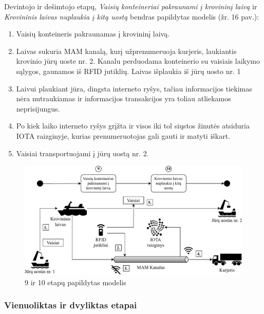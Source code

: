 Devintojo ir dešimtojo etapų, \textit{Vaisių konteineriai pakraunami į krovininį laivą} ir \textit{Krovininis laivas nuplaukia į kitą uostą} bendras papildytas modelis (žr. 16 pav.):
\begin{enumerate}
    \item Vaisių konteineris pakraunamas į krovininį laivą.
    \item Laivas sukuria MAM kanalą, kurį užprenumeruoja kurjeris, laukiantis krovinio jūrų uoste nr. 2. Kanalu perduodama konteinerio su vaisiais laikymo sąlygos, gaunamos iš RFID jutiklių. Laivas išplaukia iš jūrų uosto nr. 1
    \item Laivui plaukiant jūra, dingsta interneto ryšys, tačiau informacijos tiekimas nėra nutraukiamas ir informacijos transakcijos yra toliau atliekamos neprisijungus. 
    \item Po kiek laiko interneto ryšys grįžta ir visos iki tol siųstos žinutės atsiduria IOTA raizginyje, kurias prenumeruotojas gali gauti ir matyti iškart.
    \item Vaisiai transportuojami į jūrų uostą nr. 2.
\end{enumerate}

\begin{figure}[H]
    \centering
    \includegraphics[scale=0.68]{images/iota-usecase-9-10}
    \caption{9 ir 10 etapų papildytas modelis}
\end{figure}




\subsubsection{Vienuoliktas ir dvyliktas etapai}

